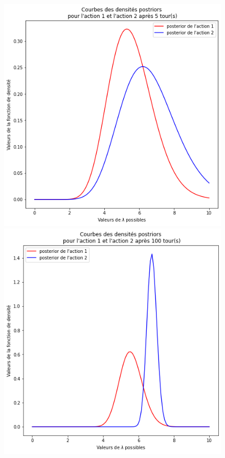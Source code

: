 \documentclass[letterpaper,11pt]{article}
\begin{document}
\begin{figure}[H]
\begin{center}
\includegraphics[scale=0.45]{posterior_tour5.png} \hfill \includegraphics[scale=0.45]{posterior_tour100.png}


\end{center}
\end{figure}
\end{document}
